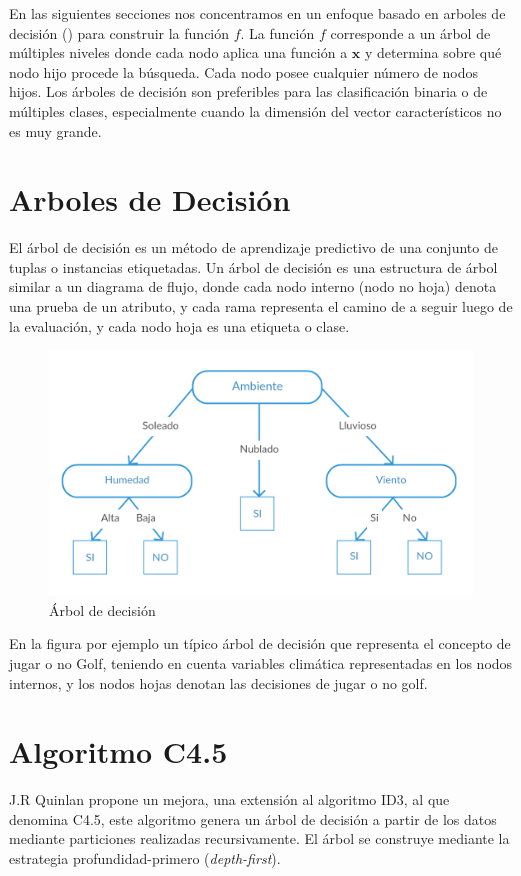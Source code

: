 En las siguientes secciones nos concentramos en un enfoque basado en arboles de decisión () para construir la función $f$. La función $f$ corresponde a un árbol de múltiples niveles donde cada nodo aplica una función a $\boldsymbol{x}$ y determina sobre qué nodo hijo procede la búsqueda. Cada nodo posee cualquier número de nodos hijos. Los árboles de decisión son preferibles para las clasificación binaria o de múltiples clases, especialmente cuando la dimensión del vector característicos no es muy grande\cite{Rajaraman2011}.

\section{Arboles de Decisión}
El árbol de decisión es un método de aprendizaje predictivo de una conjunto de tuplas o instancias etiquetadas. Un árbol de decisión es una estructura de árbol similar a un diagrama de flujo, donde cada nodo interno (nodo no hoja) denota una prueba de un atributo, y cada rama representa el camino de a seguir luego de la evaluación, y cada nodo hoja es una etiqueta o clase.

\begin{figure}[!htbp]
	\centering
	\includegraphics[width=0.7\linewidth]{capitulo-3/graphics/ad_2}
	\caption[Árbol de decisión]{Árbol de decisión}
	\label{fig:arbolEjemplo}
\end{figure}

En la figura por ejemplo un típico árbol de decisión que representa el concepto de jugar o no Golf, teniendo en cuenta variables climática representadas en los nodos internos, y los nodos hojas denotan las decisiones de jugar o no golf. 

\section{Algoritmo C4.5}
J.R Quinlan propone un mejora, una extensión al algoritmo ID3, al que denomina C4.5, este algoritmo genera un árbol de decisión a partir de los datos mediante particiones realizadas recursivamente. El árbol se construye mediante la estrategia profundidad-primero (\emph{depth-first}).

